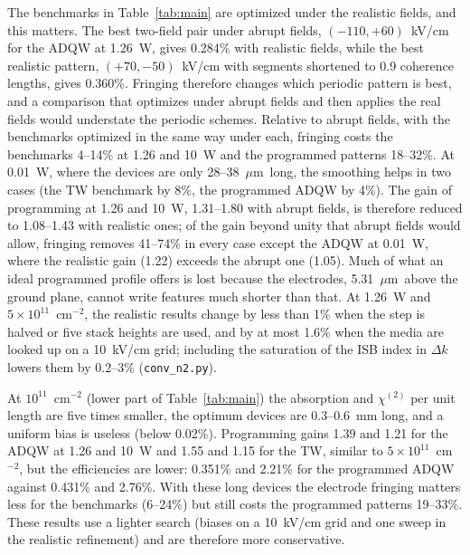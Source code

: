 \documentclass[11pt]{article}
\newcommand{\chitwo}{\chi^{(2)}}
\newcommand{\um}{~$\mu$m}
\begin{document}
The benchmarks in Table~\ref{tab:main} are optimized under the realistic fields, and this matters. The best two-field pair under abrupt fields, $(-110,+60)$~kV/cm for the ADQW at 1.26~W, gives 0.284\% with realistic fields, while the best realistic pattern, $(+70,-50)$~kV/cm with segments shortened to 0.9 coherence lengths, gives 0.360\%. Fringing therefore changes which periodic pattern is best, and a comparison that optimizes under abrupt fields and then applies the real fields would understate the periodic schemes. Relative to abrupt fields, with the benchmarks optimized in the same way under each, fringing costs the benchmarks 4--14\% at 1.26 and 10~W and the programmed patterns 18--32\%. At 0.01~W, where the devices are only 28--38\um\ long, the smoothing helps in two cases (the TW benchmark by 8\%, the programmed ADQW by 4\%). The gain of programming at 1.26 and 10~W, 1.31--1.80 with abrupt fields, is therefore reduced to 1.08--1.43 with realistic ones; of the gain beyond unity that abrupt fields would allow, fringing removes 41--74\% in every case except the ADQW at 0.01~W, where the realistic gain (1.22) exceeds the abrupt one (1.05). Much of what an ideal programmed profile offers is lost because the electrodes, 5.31\um\ above the ground plane, cannot write features much shorter than that. At 1.26~W and $5\times10^{11}$~cm$^{-2}$, the realistic results change by less than 1\% when the step is halved or five stack heights are used, and by at most 1.6\% when the media are looked up on a 10~kV/cm grid; including the saturation of the ISB index in $\Delta k$ lowers them by 0.2--3\% (\texttt{conv\_n2.py}).

At $10^{11}$~cm$^{-2}$ (lower part of Table~\ref{tab:main}) the absorption and $\chitwo$ per unit length are five times smaller, the optimum devices are 0.3--0.6~mm long, and a uniform bias is useless (below 0.02\%). Programming gains 1.39 and 1.21 for the ADQW at 1.26 and 10~W and 1.55 and 1.15 for the TW, similar to $5\times10^{11}$~cm$^{-2}$, but the efficiencies are lower: 0.351\% and 2.21\% for the programmed ADQW against 0.431\% and 2.76\%. With these long devices the electrode fringing matters less for the benchmarks (6--24\%) but still costs the programmed patterns 19--33\%. These results use a lighter search (biases on a 10~kV/cm grid and one sweep in the realistic refinement) and are therefore more conservative.
\end{document}
